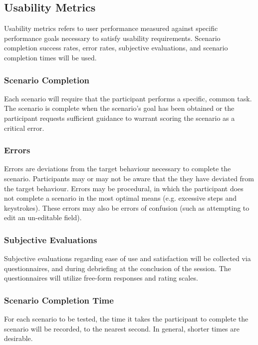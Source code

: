 \documentclass[10pt]{article}
\begin{document}
\begin{multicols}{2}
\subsection*{Usability Metrics}
Usability metrics refers to user performance measured against specific performance goals necessary to satisfy usability requirements. Scenario completion success rates, error rates, subjective evaluations, and scenario completion times will be used.\\

\subsubsection*{Scenario Completion}
Each scenario will require that the participant performs a specific, common task. The scenario is complete when the scenario's goal has been obtained or the participant requests sufficient guidance to warrant scoring the scenario as a critical error.\\

\subsubsection*{Errors}
Errors are deviations from the target behaviour necessary to complete the scenario. Participants may or may not be aware that the they have deviated from the target behaviour. Errors may be procedural, in which the participant does not complete a scenario in the most optimal means (e.g. excessive steps and keystrokes). These errors may also be errors of confusion (such as attempting to edit an un-editable field).\\

\subsubsection*{Subjective Evaluations}
Subjective evaluations regarding ease of use and satisfaction will be collected via questionnaires, and during debriefing at the conclusion of the session. The questionnaires will utilize free-form responses and rating scales.\\

\subsubsection*{Scenario Completion Time}
For each scenario to be tested, the time it takes the participant to complete the scenario will be recorded, to the nearest second. In general, shorter times are desirable.\\



\end{multicols}
\end{document}
